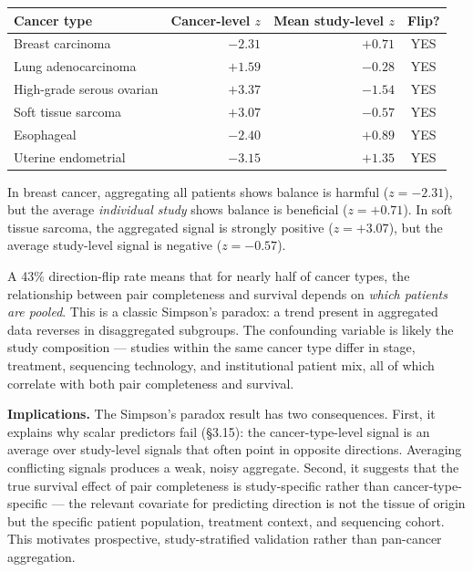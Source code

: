 \documentclass[
  11pt,
]{article}
\newcounter{none} %
\begin{document}
{\def\LTcaptype{none} %
\begin{longtable}[]{@{}lrrc@{}}
\toprule\noalign{}
Cancer type & Cancer-level \(z\) & Mean study-level \(z\) & Flip? \\
\midrule\noalign{}
\endhead
\bottomrule\noalign{}
\endlastfoot
Breast carcinoma & \(-2.31\) & \(+0.71\) & YES \\
Lung adenocarcinoma & \(+1.59\) & \(-0.28\) & YES \\
High-grade serous ovarian & \(+3.37\) & \(-1.54\) & YES \\
Soft tissue sarcoma & \(+3.07\) & \(-0.57\) & YES \\
Esophageal & \(-2.40\) & \(+0.89\) & YES \\
Uterine endometrial & \(-3.15\) & \(+1.35\) & YES \\
\end{longtable}
}

In breast cancer, aggregating all patients shows balance is harmful
(\(z = -2.31\)), but the average \emph{individual study} shows balance
is beneficial (\(z = +0.71\)). In soft tissue sarcoma, the aggregated
signal is strongly positive (\(z = +3.07\)), but the average study-level
signal is negative (\(z = -0.57\)).

A 43\% direction-flip rate means that for nearly half of cancer types,
the relationship between pair completeness and survival depends on
\emph{which patients are pooled}. This is a classic Simpson's paradox: a
trend present in aggregated data reverses in disaggregated subgroups.
The confounding variable is likely the study composition --- studies
within the same cancer type differ in stage, treatment, sequencing
technology, and institutional patient mix, all of which correlate with
both pair completeness and survival.

\textbf{Implications.} The Simpson's paradox result has two
consequences. First, it explains why scalar predictors fail (§3.15): the
cancer-type-level signal is an average over study-level signals that
often point in opposite directions. Averaging conflicting signals
produces a weak, noisy aggregate. Second, it suggests that the true
survival effect of pair completeness is study-specific rather than
cancer-type-specific --- the relevant covariate for predicting direction
is not the tissue of origin but the specific patient population,
treatment context, and sequencing cohort. This motivates prospective,
study-stratified validation rather than pan-cancer aggregation.
\end{document}
